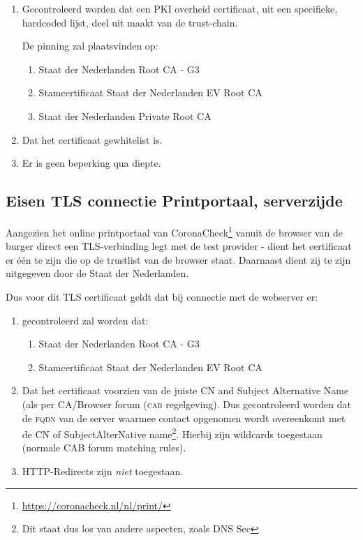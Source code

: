 \documentclass[11.0pt,twoside,openright]{report}
\begin{document}
\begin{enumerate}
\item	Gecontroleerd worden dat een PKI overheid certificaat, uit een specifieke, hardcoded lijst, deel uit maakt van de trust-chain.

De pinning zal plaatsvinden op:

\begin{enumerate}
\item Staat der Nederlanden Root CA - G3
\item Stamcertificaat Staat der Nederlanden EV Root CA 
\item Staat der Nederlanden Private Root CA 
\end{enumerate}
\item Dat het certificaat gewhitelist is.
\item Er is geen beperking qua diepte.
\end{enumerate}


\subsection{Eisen TLS connectie Printportaal, serverzijde}

Aangezien het online printportaal van CoronaCheck\footnote{\url{https://coronacheck.nl/nl/print/}} vanuit de browser van de burger direct een TLS-verbinding legt met de test provider - dient het certificaat er één te zijn die op de trustlist van de browser staat. Daarnaast dient zij te zijn uitgegeven door de Staat der Nederlanden.

Dus voor dit TLS certificaat geldt dat bij connectie met de webserver er:

\begin{enumerate}
\item gecontroleerd zal worden dat: 
\begin{enumerate}
\item Staat der Nederlanden Root CA - G3
\item Stamcertificaat Staat der Nederlanden EV Root CA 
\end{enumerate}
\item Dat het certificaat voorzien van de juiste CN and Subject Alternative Name (als per CA/Browser forum (\textsc{cab} regelgeving). Dus gecontroleerd worden dat de \textsc{fqdn} van de server waarmee contact opgenomen wordt overeenkomt met de CN of SubjectAlterNative name\footnote{Dit staat dus los van andere aspecten, zoals DNS Sec}. Hierbij zijn wildcards toegestaan (normale CAB forum matching rules).
\item HTTP-Redirects zijn \emph{niet} toegestaan.
\end{enumerate}
\end{document}
